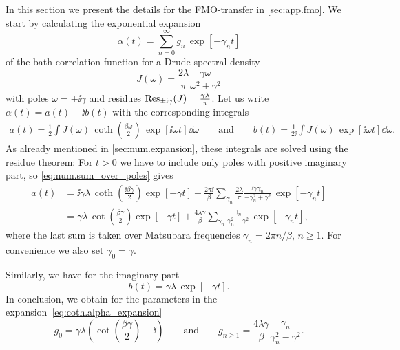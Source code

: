 In this section we present the details for the FMO-transfer in \autoref{sec:app.fmo}.
We start by calculating the exponential expansion
\begin{equation}
  \alpha(t) = \sum_{n=0}^\infty g_n\,\exp[-\gamma_n t]
  \label{eq:coth.alpha_expansion}
\end{equation}
of the bath correlation function for a Drude spectral density
\begin{equation*}
  J(\omega) = \frac{2 \lambda}{\pi} \frac{\gamma\omega}{\omega^2 + \gamma^2}
\end{equation*}
with poles $\omega = \pm \ii\gamma$ and residues $\operatorname{Res}_{\pm\mathrm{i}\gamma} (J) = \frac{\gamma\lambda}{\pi}$.
Let us write $\alpha(t) = a(t) + \ii b(t)$ with the corresponding integrals
\begin{align*}
  a(t) = \frac{1}{2} \int J(\omega) \, \coth \left( \frac{\beta\omega}{2} \right) \, \exp[\ii\omega t] \dd\omega \qquad \mbox{and} \qquad
  b(t) = \frac{1}{2\ii} \int J(\omega) \, \exp[\ii\omega t] \dd\omega.
\end{align*}
As already mentioned in \autoref{sec:num.expansion}, these integrals are solved using the residue theorem:
For $t > 0$ we have to include only poles with positive imaginary part, so \autoref{eq:num.sum_over_poles} gives
\begin{align*}
  a(t) &= \ii \gamma\lambda\, \coth \left(\frac{\ii\beta\gamma}{2}\right) \exp[-\gamma t] + \frac{2\pi\ii}{\beta} \sum_{\gamma_n} \frac{2\lambda}{\pi} \frac{\ii\gamma\gamma_n}{-\gamma_n^2 + \gamma^2} \, \exp[-\gamma_n t] \\
  &= \gamma\lambda\, \cot \left(\frac{\beta\gamma}{2}\right) \exp[-\gamma t] + \frac{4\lambda\gamma}{\beta} \sum_{\gamma_n} \frac{\gamma_n}{\gamma_n^2 - \gamma^2} \, \exp[-\gamma_n t],
\end{align*}
where the last sum is taken over Matsubara frequencies $\gamma_n = 2\pi n / \beta$, $n \ge 1$.
For convenience we also set $\gamma_0 = \gamma$.

Similarly, we have for the imaginary part
\begin{equation*}
  b(t) = \gamma\lambda \, \exp[-\gamma t].
\end{equation*}
In conclusion, we obtain for the parameters in the expansion~\ref{eq:coth.alpha_expansion}
\begin{equation*}
  g_0 = \gamma\lambda \left(\cot \left( \frac{\beta \gamma}{2}\right) - \ii\right) \qquad \mbox{and} \qquad
  g_{n\ge1} = \frac{4\lambda\gamma}{\beta} \frac{\gamma_n}{\gamma_n^2 - \gamma^2}.
\end{equation*}\\

